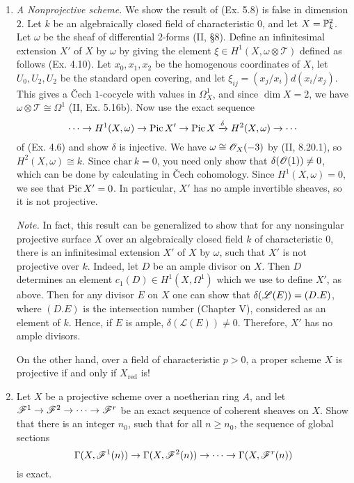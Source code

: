 \documentclass{article}
\begin{document}
\begin{enumerate} [label=\textbf{\arabic*.}, leftmargin=0em]
\item \textit{A Nonprojective scheme.} We show the result of (Ex. 5.8) is false in dimension $2$. Let $k$ be an algebraically closed field of characteristic $0$, and let $X = \mathbb{P}_k^2$. Let $\omega$ be the sheaf of differential $2$-forms (II, \S 8). Define an infinitesimal extension $X'$ of $X$ by $\omega$ by giving the element $\xi \in H^1(X, \omega \otimes \mathscr{T})$ defined as follows (Ex. 4.10). Let $x_0, x_1, x_2$ be the homogenous coordinates of $X$, let $U_0, U_2, U_2$ be the standard open covering, and let $\xi_{ij} = (x_j / x_i) d(x_i / x_j)$. This gives a Čech $1$-cocycle with values in $\Omega_X^1$, and since $\dim{X} = 2$, we have $\omega \otimes \mathscr{T} \cong \Omega^1$ (II, Ex. 5.16b). Now use the exact sequence
\begin{equation*}
  \cdots \to H^1(X, \omega) \to \operatorname{Pic}{X'} \to \operatorname{Pic}{X} \xrightarrow{\delta} H^2(X, \omega) \to \cdots
\end{equation*}
of (Ex. 4.6) and show $\delta$ is injective. We have $\omega \cong \mathscr{O}_X(-3)$ by (II, 8.20.1), so $H^2(X, \omega) \cong k$. Since $\text{char}~k = 0$, you need only show that $\delta(\mathscr{O}(1)) \neq 0$, which can be done by calculating in Čech cohomology. Since $H^1(X, \omega) = 0$, we see that $\operatorname{Pic}{X'} = 0$. In particular, $X'$ has no ample invertible sheaves, so it is not projective.

\textit{Note.} In fact, this result can be generalized to show that for any nonsingular projective surface $X$ over an algebraically closed field $k$ of characteristic $0$, there is an infinitesimal extension $X'$ of $X$ by $\omega$, such that $X'$ is not projective over $k$. Indeed, let $D$ be an ample divisor on $X$. Then $D$ determines an element $c_1(D) \in H^1(X, \Omega^1)$ which we use to define $X'$, as above. Then for any divisor $E$ on $X$ one can show that $\delta(\mathscr{L}(E)) = (D.E)$, where $(D.E)$ is the intersection number (Chapter V), considered as an element of $k$. Hence, if $E$ is ample, $\delta(\mathscr{L}(E)) \neq 0$. Therefore, $X'$ has no ample divisors.

On the other hand, over a field of characteristic $p > 0$, a proper scheme $X$ is projective if and only if $X_\text{red}$ is!

\item Let $X$ be a projective scheme over a noetherian ring $A$, and let $\mathscr{F}^1 \to \mathscr{F}^2 \to \cdots \to \mathscr{F}^r$ be an exact sequence of coherent sheaves on $X$. Show that there is an integer $n_0$, such that for all $n \geq n_0$, the sequence of global sections
\begin{equation*}
  \Gamma(X, \mathscr{F}^1(n)) \to \Gamma(X, \mathscr{F}^2(n)) \to \cdots \to \Gamma(X, \mathscr{F}^r(n))
\end{equation*}
is exact.

\end{enumerate}
\end{document}
